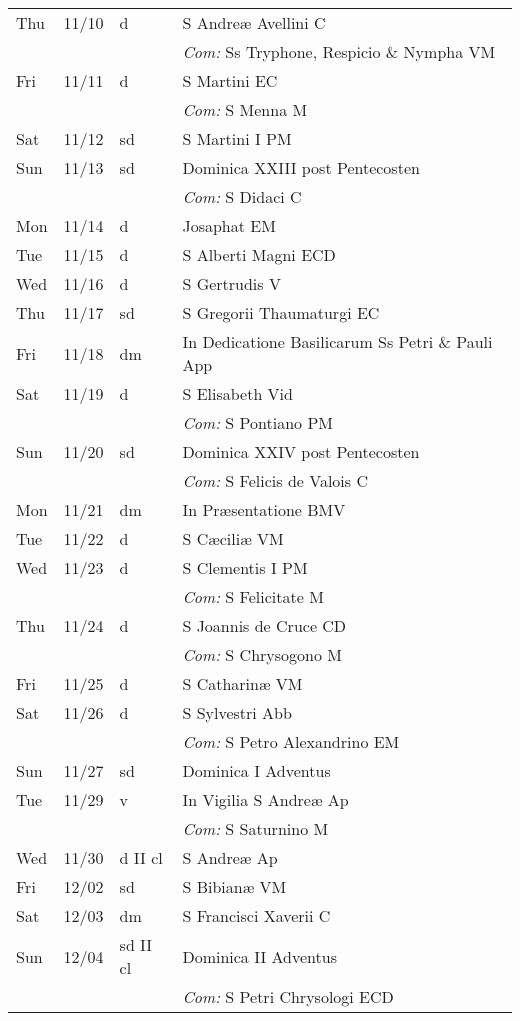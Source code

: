 \documentclass[10pt]{article}
\begin{document}
\begin{longtable}{ l l l l }
Thu & 11/10 & d & S Andreæ Avellini C\\
 & & & \textit{Com:} Ss Tryphone, Respicio \& Nympha VM\\
Fri & 11/11 & d & S Martini  EC\\
 & & & \textit{Com:} S Menna M\\
Sat & 11/12 & sd & S Martini I PM\\
Sun & 11/13 & sd & Dominica XXIII post Pentecosten\\
 & & & \textit{Com:} S Didaci C\\
Mon & 11/14 & d & Josaphat EM\\
Tue & 11/15 & d & S Alberti Magni ECD\\
Wed & 11/16 & d & S Gertrudis V\\
Thu & 11/17 & sd & S Gregorii Thaumaturgi EC\\
Fri & 11/18 & dm & In Dedicatione Basilicarum Ss Petri \& Pauli App\\
Sat & 11/19 & d & S Elisabeth Vid\\
 & & & \textit{Com:} S Pontiano PM\\
Sun & 11/20 & sd & Dominica XXIV post Pentecosten\\
 & & & \textit{Com:} S Felicis de Valois C\\
Mon & 11/21 & dm & In Præsentatione BMV\\
Tue & 11/22 & d & S Cæciliæ VM\\
Wed & 11/23 & d & S Clementis I PM\\
 & & & \textit{Com:} S Felicitate M\\
Thu & 11/24 & d & S Joannis de Cruce CD\\
 & & & \textit{Com:} S Chrysogono M\\
Fri & 11/25 & d & S Catharinæ VM\\
Sat & 11/26 & d & S Sylvestri Abb\\
 & & & \textit{Com:} S Petro Alexandrino EM\\
Sun & 11/27 & sd & Dominica I Adventus\\
Tue & 11/29 & v & In Vigilia S Andreæ Ap\\
 & & & \textit{Com:} S Saturnino M\\
Wed & 11/30 & d II cl & S Andreæ Ap\\
Fri & 12/02 & sd & S Bibianæ VM\\
Sat & 12/03 & dm & S Francisci Xaverii C\\
Sun & 12/04 & sd II cl & Dominica II Adventus\\
 & & & \textit{Com:} S Petri Chrysologi ECD\\

\end{longtable}
\end{document}
